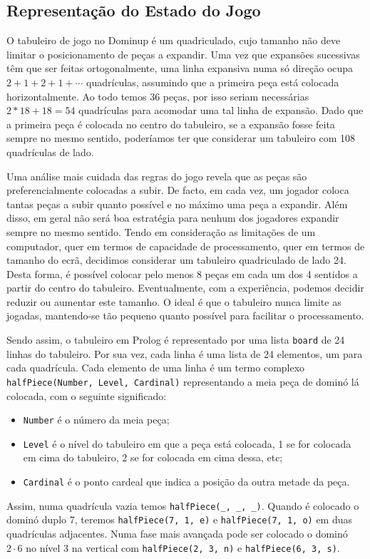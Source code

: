 \documentclass[a4paper]{article}
\begin{document}
\subsection{Representação do Estado do Jogo} 

O tabuleiro de jogo no Dominup é um quadriculado, cujo tamanho não deve limitar o posicionamento de peças a expandir. Uma vez que expansões sucessivas têm que ser feitas ortogonalmente, uma linha expansiva numa só direção ocupa $2 + 1 + 2 + 1 + \cdots$ quadrículas, assumindo que a primeira peça está colocada horizontalmente. Ao todo temos 36 peças, por isso seriam necessárias $2 * 18 + 18 = 54$ quadrículas para acomodar uma tal linha de expansão. Dado que a primeira peça é colocada no centro do tabuleiro, se a expansão fosse feita sempre no mesmo sentido, poderíamos ter que considerar um tabuleiro com 108 quadrículas de lado.

Uma análise mais cuidada das regras do jogo revela que as peças são preferencialmente colocadas a subir. De facto, em cada vez, um jogador coloca tantas peças a subir quanto possível e no máximo uma peça a expandir. Além disso, em geral não será boa estratégia para nenhum dos jogadores expandir sempre no mesmo sentido. Tendo em consideração as limitações de um computador, quer em termos de capacidade de processamento, quer em termos de tamanho do ecrã, decidimos considerar um tabuleiro quadriculado de lado 24. Desta forma, é possível colocar pelo menos 8 peças em cada um dos 4 sentidos a partir do centro do tabuleiro. Eventualmente, com a experiência, podemos decidir reduzir ou aumentar este tamanho. O ideal é que o tabuleiro nunca limite as jogadas, mantendo-se tão pequeno quanto possível para facilitar o processamento.

Sendo assim, o tabuleiro em Prolog é representado por uma lista \verb|board| de 24 linhas do tabuleiro. Por sua vez, cada linha é uma lista de 24 elementos, um para cada quadrícula. Cada elemento de uma linha é um termo complexo \verb|halfPiece(Number, Level, Cardinal)| representando a meia peça de dominó lá colocada, com o seguinte significado:
\begin{itemize}
	\item \verb|Number| é o número da meia peça;
	\item \verb|Level| é o nível do tabuleiro em que a peça está colocada, 1 se for colocada em cima do tabuleiro, 2 se for colocada em cima dessa, etc;
	\item \verb|Cardinal| é o ponto cardeal que indica a posição da outra metade da peça.
\end{itemize}
Assim, numa quadrícula vazia temos \verb|halfPiece(_, _, _)|. Quando é colocado o dominó duplo 7, teremos \verb|halfPiece(7, 1, e)| e \verb|halfPiece(7, 1, o)| em duas quadrículas adjacentes. Numa fase mais avançada pode ser colocado o dominó $2 \cdot 6$ no nível 3 na vertical com \verb|halfPiece(2, 3, n)| e \verb|halfPiece(6, 3, s)|.
\end{document}
